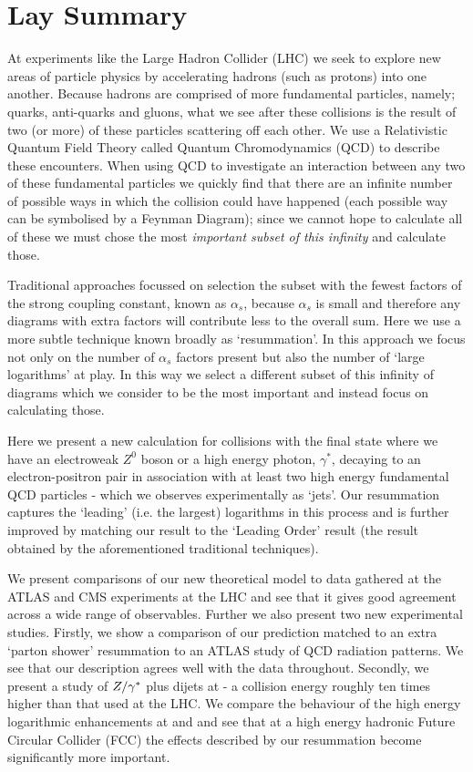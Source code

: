 \chapter*{Lay Summary}
\noindent
	At experiments like the Large Hadron Collider (LHC) we seek to explore new areas of particle
	physics by accelerating hadrons (such as protons) into one another.  Because hadrons are
	comprised of more fundamental particles, namely; quarks, anti-quarks and gluons, what we
	see after these collisions is the result of two (or more) of these particles
	scattering off each other.  We use a Relativistic Quantum Field Theory called Quantum
	Chromodynamics (QCD) to describe these encounters.  When using QCD to investigate an
	interaction between any two of these fundamental particles we quickly find that there
	are an infinite number of possible ways in which the collision could have happened (each
	possible way can be symbolised by a Feynman Diagram); since we cannot hope to calculate
	all of these we must chose the most \emph{important subset of this infinity} and calculate those.

	Traditional approaches focussed on selection the subset with the fewest factors of the
	strong coupling constant, known as $\alpha_s$, because $\alpha_s$ is small and therefore
	any diagrams with extra factors will contribute less to the overall sum.  Here we use a
	more subtle technique known broadly as `resummation'.  In this approach we focus not only
	on the number of $\alpha_s$ factors present but also the number of `large logarithms' at
	play.  In this way we select a different subset of this infinity of diagrams which we consider
	to be the most important and instead focus on calculating those.

	Here we present a new calculation for collisions with the final state where we have an electroweak $Z^0$ boson or a
	high energy photon, $\gamma^*$, decaying to an electron-positron pair in
	association with at least two high energy fundamental QCD particles - which we observes
	experimentally as `jets'.  Our resummation captures the `leading' (i.e. the largest)
	logarithms in this process and is further improved by matching our result to the `Leading
	Order' result (the result obtained by the aforementioned traditional techniques).

	We present comparisons of our new theoretical model to data gathered at the ATLAS
	and CMS experiments at the LHC and see that it gives good agreement across a wide range of
	observables.  Further we also present two new experimental studies.  Firstly, we show a
	comparison of our prediction matched to an extra `parton shower' resummation to an ATLAS
	study of QCD radiation patterns.  We see that our description agrees well with
	the data throughout.  Secondly, we present a study of $Z/\gamma^*$ plus dijets at \htev - a collision
	energy roughly ten times higher than that used at the LHC.  We compare the behaviour of the
	high energy logarithmic enhancements at \stev and \htev and see that at a high energy
	hadronic Future Circular Collider (FCC) the effects described by our resummation become
	significantly more important.
\vspace{10mm}
\normalsize

